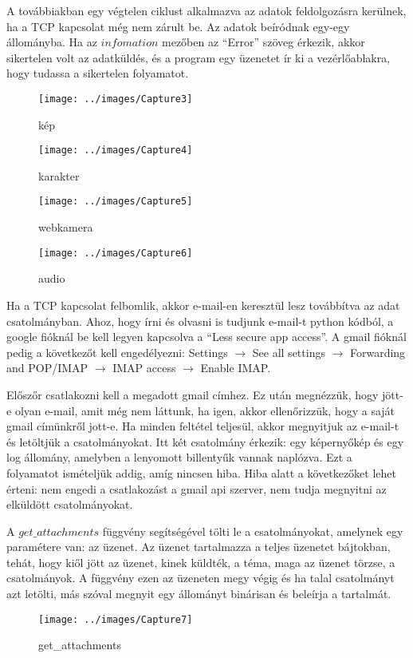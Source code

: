 \documentclass[a4paper, 11pt]{article}
\begin{document}
A továbbiakban egy végtelen ciklust alkalmazva az adatok feldolgozásra kerülnek, ha a TCP kapcsolat még nem zárult be. Az adatok beíródnak egy-egy állományba. Ha az $infomation$ mezőben az ``Error'' szöveg érkezik, akkor sikertelen volt az adatküldés, és a program egy üzenetet ír ki a vezérlőablakra, hogy tudassa a sikertelen folyamatot.
\begin{figure}[H]
\centering
\texttt{[image: ../images/Capture3]}
\caption{kép}
\label{fig:imgprocess}
\end{figure}
\begin{figure}[H]
\centering
\texttt{[image: ../images/Capture4]}
\caption{karakter}
\label{fig:charprocess}
\end{figure}
\begin{figure}[H]
\centering
\texttt{[image: ../images/Capture5]}
\caption{webkamera}
\label{fig:webcamprocess}
\end{figure}
\begin{figure}[H]
\centering
\texttt{[image: ../images/Capture6]}
\caption{audio}
\label{fig:audioprocess}
\end{figure}

Ha a TCP kapcsolat felbomlik, akkor e-mail-en keresztül lesz továbbítva az adat csatolmányban. Ahoz, hogy írni és olvasni is tudjunk e-mail-t python kódból, a google fióknál be kell legyen kapcsolva a ``Less secure app access''. A gmail fióknál pedig a következőt kell engedélyezni: Settings $\rightarrow$ See all settings $\rightarrow$ Forwarding and POP/IMAP $\rightarrow$ IMAP access $\rightarrow$ Enable IMAP.

Előszőr csatlakozni kell a megadott gmail címhez. Ez után megnézzük, hogy jött-e olyan e-mail, amit még nem láttunk, ha igen, akkor ellenőrizzük, hogy a saját gmail címünkről jott-e. Ha minden feltétel teljesül, akkor megnyitjuk az e-mail-t és letöltjük a csatolmányokat. Itt két csatolmány érkezik: egy képernyőkép és egy log állomány, amelyben a lenyomott billentyűk vannak naplózva. Ezt a folyamatot ismételjük addig, amíg nincsen hiba. Hiba alatt a következőket lehet érteni: nem engedi a csatlakozást a gmail api szerver, nem tudja megnyitni az elküldött csatolmányokat.

A $get\_attachments$ függvény segítségével tölti le a csatolmányokat, amelynek egy paramétere van: az üzenet. Az üzenet tartalmazza a teljes üzenetet bájtokban, tehát, hogy kiől jött az üzenet, kinek küldték, a téma, maga az üzenet törzse, a csatolmányok. A függvény ezen az üzeneten megy végig és ha talal csatolmányt azt letölti, más szóval megnyit egy állományt binárisan és beleírja a tartalmát.
\begin{figure}[H]
\centering
\texttt{[image: ../images/Capture7]}
\caption{get\_attachments}
\label{fig:getatt}
\end{figure}
\end{document}
